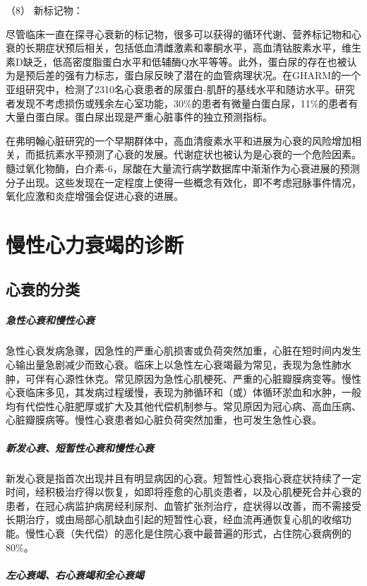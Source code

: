 \hypertarget{text00072.htmlux5cux23CHP3-3-1-2-2-3-8}{}
（8） 新标记物：

尽管临床一直在探寻心衰新的标记物，很多可以获得的循环代谢、营养标记物和心衰的长期症状预后相关，包括低血清雌激素和睾酮水平，高血清钴胺素水平，维生素D缺乏，低高密度脂蛋白水平和低辅酶Q水平等等。此外，蛋白尿的存在也被认为是预后差的强有力标志，蛋白尿反映了潜在的血管病理状况。在GHARM的一个亚组研究中，检测了2310名心衰患者的尿蛋白-肌酐的基线水平和随访水平。研究者发现不考虑损伤或残余左心室功能，30\%的患者有微量白蛋白尿，11\%的患者有大量白蛋白尿。蛋白尿出现是严重心脏事件的独立预测指标。

在弗明翰心脏研究的一个早期群体中，高血清瘦素水平和进展为心衰的风险增加相关，而抵抗素水平预测了心衰的发展。代谢症状也被认为是心衰的一个危险因素。髓过氧化物酶，白介素-6，尿酸在大量流行病学数据库中渐渐作为心衰进展的预测分子出现。这些发现在一定程度上使得一些概念有效化，即不考虑冠脉事件情况，氧化应激和炎症增强会促进心衰的进展。

\protect\hypertarget{text00073.html}{}{}

\section{慢性心力衰竭的诊断}

\subsection{心衰的分类}

\subparagraph{急性心衰和慢性心衰}

急性心衰发病急骤，因急性的严重心肌损害或负荷突然加重，心脏在短时间内发生心输出量急剧减少而致心衰。临床上以急性左心衰竭最为常见，表现为急性肺水肿，可伴有心源性休克。常见原因为急性心肌梗死、严重的心脏瓣膜病变等。慢性心衰临床多见，其发病过程缓慢，表现为肺循环和（或）体循环淤血和水肿，一般均有代偿性心脏肥厚或扩大及其他代偿机制参与。常见原因为冠心病、高血压病、心脏瓣膜病等。慢性心衰患者如心脏负荷突然加重，也可发生急性心衰。

\subparagraph{新发心衰、短暂性心衰和慢性心衰}

新发心衰是指首次出现并且有明显病因的心衰。短暂性心衰指心衰症状持续了一定时间，经积极治疗得以恢复，如即将痊愈的心肌炎患者，以及心肌梗死合并心衰的患者，在冠心病监护病房经利尿剂、血管扩张剂治疗，症状得以改善，而不需接受长期治疗，或由局部心肌缺血引起的短暂性心衰，经血流再通恢复心肌的收缩功能。慢性心衰（失代偿）的恶化是住院心衰中最普遍的形式，占住院心衰病例的80\%。

\subparagraph{左心衰竭、右心衰竭和全心衰竭}

